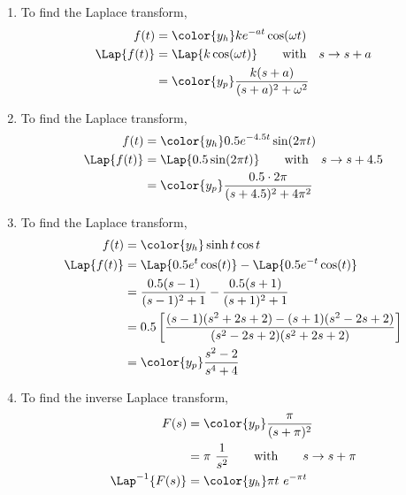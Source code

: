 \begin{enumerate}
    \item To find the Laplace transform,
          \begin{align}
              f(t)         & = \color{y_h} ke^{-at}\cos(\omega t)            \\
              \Lap\{f(t)\} & = \Lap\{k\cos(\omega t)\} \qquad
              \text{with}\quad s \to s+a                                     \\
                           & = \color{y_p} \frac{k(s+a)}{(s+a)^2 + \omega^2}
          \end{align}

    \item To find the Laplace transform,
          \begin{align}
              f(t)         & = \color{y_h} 0.5e^{-4.5t}\sin(2\pi t) \\
              \Lap\{f(t)\} & = \Lap\{0.5\sin(2\pi t)\} \qquad
              \text{with}\quad s \to s+4.5                          \\
                           & = \color{y_p} \frac{0.5 \cdot 2\pi}
              {(s+4.5)^2 + 4\pi^2}
          \end{align}

    \item To find the Laplace transform,
          \begin{align}
              f(t)         & = \color{y_h} \sinh t \cos t                         \\
              \Lap\{f(t)\} & = \Lap\{0.5e^{t}\cos(t)\} - \Lap\{0.5e^{-t}\cos(t)\} \\
                           & = \frac{0.5(s-1)}{(s-1)^2 + 1}
              - \frac{0.5(s+1)}{(s+1)^2 + 1}                                      \\
                           & = 0.5\left[ \frac{(s-1)(s^2+2s+2)
              - (s+1)(s^2 - 2s + 2)} {(s^2 - 2s + 2)(s^2 + 2s + 2)} \right]       \\
                           & = \color{y_p}\frac{s^2 - 2}{s^4 + 4}
          \end{align}

    \item To find the inverse Laplace transform,
          \begin{align}
              F(s)              & = \color{y_p} \frac{\pi}{(s+\pi)^2} \\
                                & = \pi\ \frac{1}{s^2}
              \qquad \text{with} \qquad s \to s+\pi                   \\
              \Lap^{-1}\{F(s)\} & = \color{y_h} \pi t\ e^{-\pi t}
          \end{align}


\end{enumerate}
